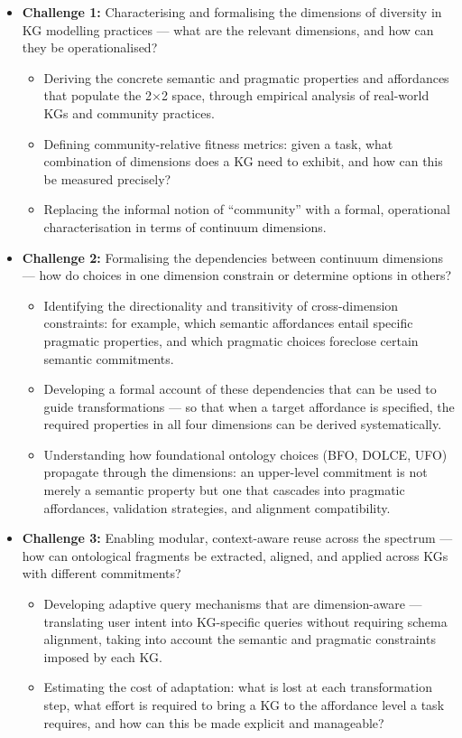\documentclass[runningheads]{llncs}
\begin{document}
\begin{itemize}
    \item \textbf{Challenge 1:} Characterising and formalising the dimensions of diversity in KG modelling practices --- what are the relevant dimensions, and how can they be operationalised?
    \begin{itemize}
        \item Deriving the concrete semantic and pragmatic properties and affordances that populate the 2$\times$2 space, through empirical analysis of real-world KGs and community practices. %
        \item Defining community-relative fitness metrics: given a task, what combination of dimensions does a KG need to exhibit, and how can this be measured precisely? %
        \item Replacing the informal notion of ``community'' with a formal, operational characterisation in terms of continuum dimensions. %
    \end{itemize}
	\item \textbf{Challenge 2:} Formalising the dependencies between continuum dimensions --- how do choices in one dimension constrain or determine options in others?
    \begin{itemize}
        \item Identifying the directionality and transitivity of cross-dimension constraints: for example, which semantic affordances entail specific pragmatic properties, and which pragmatic choices foreclose certain semantic commitments. %
        \item Developing a formal account of these dependencies that can be used to guide transformations --- so that when a target affordance is specified, the required properties in all four dimensions can be derived systematically. %
        \item Understanding how foundational ontology choices (BFO, DOLCE, UFO) propagate through the dimensions: an upper-level commitment is not merely a semantic property but one that cascades into pragmatic affordances, validation strategies, and alignment compatibility. %
    \end{itemize}
	
    \item \textbf{Challenge 3:} Enabling modular, context-aware reuse across the spectrum --- how can ontological fragments be extracted, aligned, and applied across KGs with different commitments?
    \begin{itemize}
        \item Developing adaptive query mechanisms that are dimension-aware --- translating user intent into KG-specific queries without requiring schema alignment, taking into account the semantic and pragmatic constraints imposed by each KG. %
        \item Estimating the cost of adaptation: what is lost at each transformation step, what effort is required to bring a KG to the affordance level a task requires, and how can this be made explicit and manageable? %
    \end{itemize}


\end{itemize}
\end{document}
